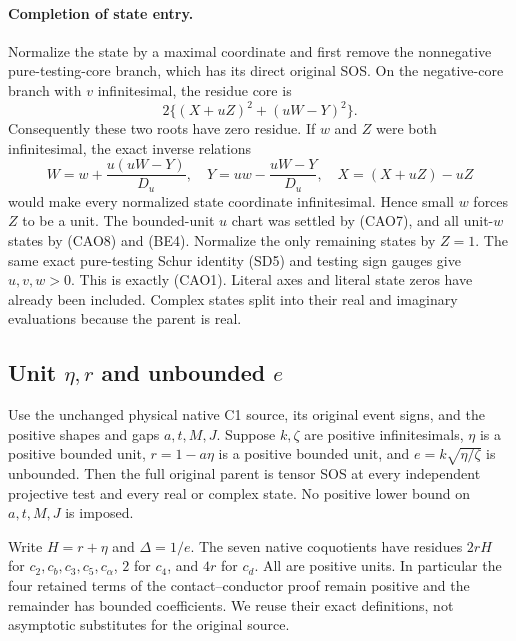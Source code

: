\paragraph{Completion of state entry.}
Normalize the state by a maximal coordinate and first remove the
nonnegative pure-testing-core branch, which has its direct original
SOS. On the negative-core branch with $v$ infinitesimal, the residue
core is
\[
 2\{(X+uZ)^2+(uW-Y)^2\}.
\]
Consequently these two roots have zero residue. If $w$ and $Z$ were
both infinitesimal, the exact inverse relations
\[
 W=w+\frac{u(uW-Y)}{D_u},\quad
 Y=uw-\frac{uW-Y}{D_u},\quad X=(X+uZ)-uZ
\]
would make every normalized state coordinate infinitesimal. Hence
small $w$ forces $Z$ to be a unit. The bounded-unit $u$ chart was
settled by (CAO7), and all unit-$w$ states by (CAO8) and (BE4).
Normalize the only remaining states by $Z=1$. The same exact
pure-testing Schur identity (SD5) and testing sign gauges give
$u,v,w>0$. This is exactly (CAO1). Literal axes and literal state
zeros have already been included. Complex states split into their
real and imaginary evaluations because the parent is real.



\subsection{Unit $\eta,r$ and unbounded $e$}

\label{component:p890eea5f538b}

\begin{theorem}
Use the unchanged physical native C1 source, its original event signs,
and the positive shapes and gaps $a,t,M,J$. Suppose $k,\zeta$ are
positive infinitesimals, $\eta$ is a positive bounded unit,
$r=1-a\eta$ is a positive bounded unit, and $e=k\sqrt{\eta/\zeta}$
is unbounded. Then the full original parent is tensor SOS at every
independent projective test and every real or complex state.
No positive lower bound on $a,t,M,J$ is imposed.
\end{theorem}

Write $H=r+\eta$ and $\Delta=1/e$. The seven native coquotients
have residues $2rH$ for $c_2,c_b,c_3,c_5,c_\alpha$, $2$ for
$c_4$, and $4r$ for $c_d$. All are positive units. In particular the
four retained terms of the contact--conductor proof remain positive
and the remainder has bounded coefficients. We reuse their exact
definitions, not asymptotic substitutes for the original source.

